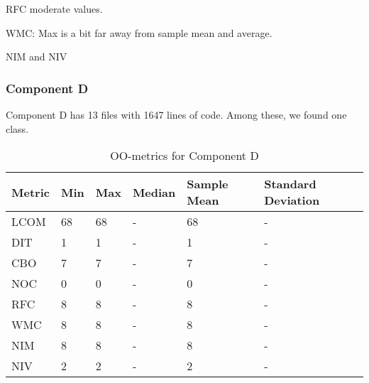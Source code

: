 RFC moderate values.

WMC: Max is a bit far away from sample mean and average.

NIM and NIV






\subsubsection{Component D}
Component D has 13 files with 1647 lines of code. Among these, we found one class. 
\begin{table}[]
\centering
\caption{OO-metrics for Component D}
\label{tab:oometrics-dist}
\begin{tabular}{|l|l|l|l|l|l|}
\hline
\textbf{Metric} & \textbf{Min} & \textbf{Max} & \textbf{Median} & \textbf{Sample Mean} & \textbf{Standard Deviation} \\ \hline
LCOM            & 68           & 68           & -               & 68                   & -                           \\ \hline
DIT             & 1            & 1            & -               & 1                    & -                           \\ \hline
CBO             & 7            & 7            & -               & 7                    & -                           \\ \hline
NOC             & 0            & 0            & -               & 0                    & -                           \\ \hline
RFC             & 8            & 8            & -               & 8                    & -                           \\ \hline
WMC             & 8            & 8            & -               & 8                    & -                           \\ \hline
NIM             & 8            & 8            & -               & 8                    & -                           \\ \hline
NIV             & 2            & 2            & -               & 2                    & -                           \\ \hline
\end{tabular}
\end{table}






